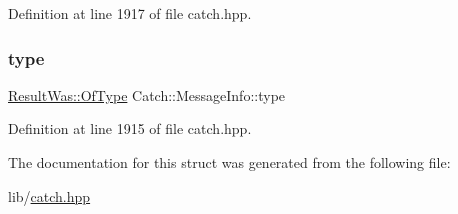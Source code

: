 Definition at line 1917 of file catch.\+hpp.

\hypertarget{struct_catch_1_1_message_info_ae928b9117465c696e45951d9d0284e78}{}\label{struct_catch_1_1_message_info_ae928b9117465c696e45951d9d0284e78} 
\subsubsection{\texorpdfstring{type}{type}}
{\footnotesize\ttfamily \hyperlink{struct_catch_1_1_result_was_a624e1ee3661fcf6094ceef1f654601ef}{Result\+Was\+::\+Of\+Type} Catch\+::\+Message\+Info\+::type}



Definition at line 1915 of file catch.\+hpp.



The documentation for this struct was generated from the following file\+:\begin{DoxyCompactItemize}
\item 
lib/\hyperlink{catch_8hpp}{catch.\+hpp}\end{DoxyCompactItemize}
